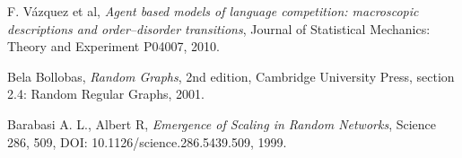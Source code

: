 \documentclass[english]{cccconf}
\begin{document}
\begin{thebibliography}{0}
 F. V{\'a}zquez et al, \textit{Agent based models of language competition: macroscopic descriptions and order–disorder transitions}, Journal of Statistical Mechanics: Theory and Experiment P04007, 2010.

 Bela Bollobas, \textit{Random Graphs}, 2nd edition, Cambridge University Press, section 2.4: Random Regular Graphs, 2001.

Barabasi A. L., Albert R, \textit{Emergence of Scaling in Random Networks}, Science 286, 509, DOI: 10.1126/science.286.5439.509, 1999.

\end{thebibliography}
\end{document}
